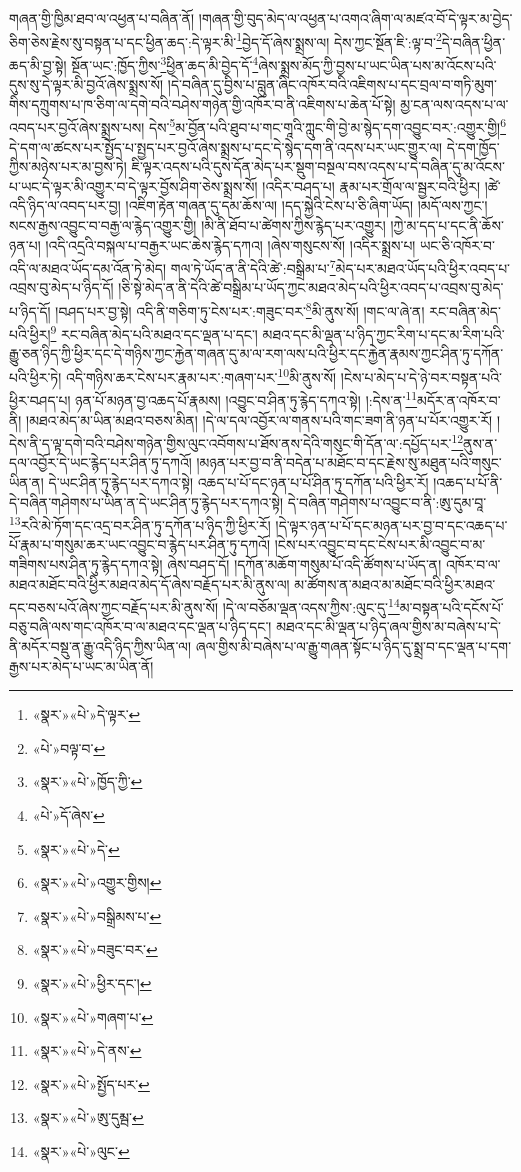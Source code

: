 གཞན་གྱི་ཁྱིམ་ཐབ་ལ་འཕྱན་པ་བཞིན་ནོ། །གཞན་གྱི་བུད་མེད་ལ་འཕྱན་པ་འགའ་ཞིག་ལ་མཛའ་བོ་དེ་ལྟར་མ་བྱེད་ཅིག་ཅེས་རྗེས་སུ་བསྟན་པ་དང་ཕྱིན་ཆད་:དེ་ལྟར་མི་\footnote{«སྣར་»«པེ་»དེ་ལྟར་}བྱེད་དོ་ཞེས་སྨྲས་ལ། དེས་ཀྱང་སྔོན་ཇི་:ལྟ་བ་\footnote{«པེ་»བལྟ་བ་}དེ་བཞིན་ཕྱིན་ཆད་མི་བྱ་སྟེ། སྔོན་ཡང་:ཁྱོད་ཀྱིས་\footnote{«སྣར་»«པེ་»ཁྱོད་ཀྱི་}ཕྱིན་ཆད་མི་བྱེད་དོ་\footnote{«པེ་»དོ་ཞེས་}ཞེས་སྨྲས་མོད་ཀྱི་བྱས་པ་ཡང་ཡིན་པས་མ་འོངས་པའི་དུས་སུ་དེ་ལྟར་མི་བྱའོ་ཞེས་སྨྲས་སོ། །དེ་བཞིན་དུ་བྱིས་པ་བླུན་ཞིང་འཁོར་བའི་འཇིགས་པ་དང་བྲལ་བ་གཏི་མུག་གིས་དཀྲུགས་པ་ཁ་ཅིག་ལ་དགེ་བའི་བཤེས་གཉེན་གྱི་འཁོར་བ་ནི་འཇིགས་པ་ཆེན་པོ་སྟེ། མྱ་ངན་ལས་འདས་པ་ལ་འབད་པར་བྱའོ་ཞེས་སྨྲས་པས། དེས་\footnote{«སྣར་»«པེ་»དེ་}མ་བྱོན་པའི་ཐུབ་པ་གང་གཱའི་ཀླུང་གི་བྱེ་མ་སྙེད་དག་འབྱུང་བར་:འགྱུར་གྱི།\footnote{«སྣར་»«པེ་»འགྱུར་གྱིས།} དེ་དག་ལ་ཚངས་པར་སྤྱོད་པ་སྤྱད་པར་བྱའོ་ཞེས་སྨྲས་པ་དང་དེ་སྙེད་དག་ནི་འདས་པར་ཡང་གྱུར་ལ། དེ་དག་ཁྱོད་ཀྱིས་མཉེས་པར་མ་བྱས་ཏེ། ཇི་ལྟར་འདས་པའི་དུས་དོན་མེད་པར་སྡུག་བསྔལ་བས་འདས་པ་དེ་བཞིན་དུ་མ་འོངས་པ་ཡང་དེ་ལྟར་མི་འགྱུར་བ་དེ་ལྟར་བྱོས་ཤིག་ཅེས་སྨྲས་སོ། །འདིར་བཤད་པ། རྣམ་པར་གྲོལ་ལ་སྦྱར་བའི་ཕྱིར། །ཚེ་འདི་ཉིད་ལ་འབད་པར་བྱ། །འཇིག་རྟེན་གཞན་དུ་དམ་ཆོས་ལ། །དད་སྐྱེའི་ངེས་པ་ཅི་ཞིག་ཡོད། །མདོ་ལས་ཀྱང་། སངས་རྒྱས་འབྱུང་བ་བརྒྱ་ལ་རྙེད་འགྱུར་གྱི། །མི་ནི་ཐོབ་པ་ཚེགས་ཀྱིས་རྙེད་པར་འགྱུར། །ཀྱེ་མ་དད་པ་དང་ནི་ཆོས་ཉན་པ། །འདི་འདྲའི་བསྐལ་པ་བརྒྱར་ཡང་ཆེས་རྙེད་དཀའ། །ཞེས་གསུངས་སོ། །འདིར་སྨྲས་པ། ཡང་ཅི་འཁོར་བ་འདི་ལ་མཐའ་ཡོད་དམ་འོན་ཏེ་མེད། གལ་ཏེ་ཡོད་ན་ནི་དེའི་ཚེ་:བསྒྲིམ་པ་\footnote{«སྣར་»«པེ་»བསྒྲིམས་པ་}མེད་པར་མཐའ་ཡོད་པའི་ཕྱིར་འབད་པ་འབྲས་བུ་མེད་པ་ཉིད་དོ། །ཅི་སྟེ་མེད་ན་ནི་དེའི་ཚེ་བསྒྲིམ་པ་ཡོད་ཀྱང་མཐའ་མེད་པའི་ཕྱིར་འབད་པ་འབྲས་བུ་མེད་པ་ཉིད་དོ། །བཤད་པར་བྱ་སྟེ། འདི་ནི་གཅིག་ཏུ་ངེས་པར་:གཟུང་བར་\footnote{«སྣར་»«པེ་»བཟུང་བར་}མི་ནུས་སོ། །གང་ལ་ཞེ་ན། རང་བཞིན་མེད་པའི་ཕྱིར།\footnote{«སྣར་»«པེ་»ཕྱིར་དང་།} རང་བཞིན་མེད་པའི་མཐའ་དང་ལྡན་པ་དང་། མཐའ་དང་མི་ལྡན་པ་ཉིད་ཀྱང་རིག་པ་དང་མ་རིག་པའི་རྒྱུ་ཅན་ཉིད་ཀྱི་ཕྱིར་དང་དེ་གཉིས་ཀྱང་རྐྱེན་གཞན་དུ་མ་ལ་རག་ལས་པའི་ཕྱིར་དང་རྐྱེན་རྣམས་ཀྱང་ཤིན་ཏུ་དཀོན་པའི་ཕྱིར་ཏེ། འདི་གཉིས་ཆར་ངེས་པར་རྣམ་པར་:གཞག་པར་\footnote{«སྣར་»«པེ་»གཞག་པ་}མི་ནུས་སོ། །ངེས་པ་མེད་པ་དེ་ཉེ་བར་བསྟན་པའི་ཕྱིར་བཤད་པ། ཉན་པོ་མཉན་བྱ་འཆད་པོ་རྣམས། །འབྱུང་བ་ཤིན་ཏུ་རྙེད་དཀའ་སྟེ། །:དེས་ན་\footnote{«སྣར་»«པེ་»དེ་ནས་}མདོར་ན་འཁོར་བ་ནི། །མཐའ་མེད་མ་ཡིན་མཐའ་བཅས་མིན། །དེ་ལ་དལ་འབྱོར་ལ་གནས་པའི་གང་ཟག་ནི་ཉན་པ་པོར་འགྱུར་རོ། །དེས་ནི་ད་ལྟ་དགེ་བའི་བཤེས་གཉེན་གྱིས་ལུང་འབོགས་པ་ཐོས་ནས་དེའི་གསུང་གི་དོན་ལ་:དཔྱོད་པར་\footnote{«སྣར་»«པེ་»སྤྱོད་པར་}ནུས་ན་དལ་འབྱོར་དེ་ཡང་རྙེད་པར་ཤིན་ཏུ་དཀའོ། །མཉན་པར་བྱ་བ་ནི་བདེན་པ་མཐོང་བ་དང་རྗེས་སུ་མཐུན་པའི་གསུང་ཡིན་ན། དེ་ཡང་ཤིན་ཏུ་རྙེད་པར་དཀའ་སྟེ། འཆད་པ་པོ་དང་ཉན་པ་པོ་ཤིན་ཏུ་དཀོན་པའི་ཕྱིར་རོ། །འཆད་པ་པོ་ནི་དེ་བཞིན་གཤེགས་པ་ཡིན་ན་དེ་ཡང་ཤིན་ཏུ་རྙེད་པར་དཀའ་སྟེ། དེ་བཞིན་གཤེགས་པ་འབྱུང་བ་ནི་:ཨུ་དུམ་བཱ་\footnote{«སྣར་»«པེ་»ཨུ་དུམྦ་}རའི་མེ་ཏོག་དང་འདྲ་བར་ཤིན་ཏུ་དཀོན་པ་ཉིད་ཀྱི་ཕྱིར་རོ། །དེ་ལྟར་ཉན་པ་པོ་དང་མཉན་པར་བྱ་བ་དང་འཆད་པ་པོ་རྣམ་པ་གསུམ་ཆར་ཡང་འབྱུང་བ་རྙེད་པར་ཤིན་ཏུ་དཀའོ། །ངེས་པར་འབྱུང་བ་དང་ངེས་པར་མི་འབྱུང་བ་མ་གཟིགས་པས་ཤིན་ཏུ་རྙེད་དཀའ་སྟེ། ཞེས་བཤད་དོ། །དཀོན་མཆོག་གསུམ་པོ་འདི་ཚོགས་པ་ཡོད་ན། འཁོར་བ་ལ་མཐའ་མཐོང་བའི་ཕྱིར་མཐའ་མེད་དོ་ཞེས་བརྗོད་པར་མི་ནུས་ལ། མ་ཚོགས་ན་མཐའ་མ་མཐོང་བའི་ཕྱིར་མཐའ་དང་བཅས་པའོ་ཞེས་ཀྱང་བརྗོད་པར་མི་ནུས་སོ། །དེ་ལ་བཅོམ་ལྡན་འདས་ཀྱིས་:ལུང་དུ་\footnote{«སྣར་»«པེ་»ལུང་}མ་བསྟན་པའི་དངོས་པོ་བཅུ་བཞི་ལས་གང་འཁོར་བ་ལ་མཐའ་དང་ལྡན་པ་ཉིད་དང་། མཐའ་དང་མི་ལྡན་པ་ཉིད་ཞལ་གྱིས་མ་བཞེས་པ་དེ་ནི་མདོར་བསྡུ་ན་རྒྱུ་འདི་ཉིད་ཀྱིས་ཡིན་ལ། ཞལ་གྱིས་མི་བཞེས་པ་ལ་རྒྱུ་གཞན་སྟོང་པ་ཉིད་དུ་སྨྲ་བ་དང་ལྡན་པ་དག་རྒྱས་པར་མེད་པ་ཡང་མ་ཡིན་ནོ། 
